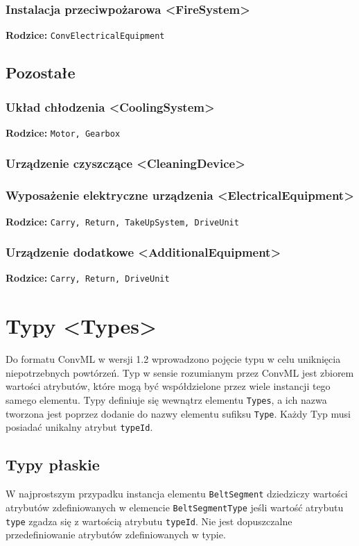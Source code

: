 \documentclass[12pt,a4paper]{article}
\begin{document}
\subsubsection{Instalacja przeciwpożarowa <FireSystem>}
\noindent\textbf{Rodzice:} \texttt{ConvElectricalEquipment}

\subsection{Pozostałe}

\subsubsection{Układ chłodzenia <CoolingSystem>}
\noindent\textbf{Rodzice:} \texttt{Motor, Gearbox}

\subsubsection{Urządzenie czyszczące <CleaningDevice>}


\subsubsection{Wyposażenie elektryczne urządzenia <ElectricalEquipment>}
\noindent\textbf{Rodzice:} \texttt{Carry, Return, TakeUpSystem, DriveUnit}


\subsubsection{Urządzenie dodatkowe <AdditionalEquipment>}
\noindent\textbf{Rodzice:} \texttt{Carry, Return, DriveUnit}


\section{Typy <Types>}\label{sec:Types}
Do formatu ConvML w wersji 1.2 wprowadzono pojęcie typu w celu uniknięcia
niepotrzebnych powtórzeń.  Typ w sensie rozumianym przez ConvML jest zbiorem
wartości atrybutów, które mogą być współdzielone przez wiele instancji tego
samego elementu.  Typy definiuje się wewnątrz elementu {\tt Types}, a ich nazwa
tworzona jest poprzez dodanie do nazwy elementu sufiksu {\tt Type}. Każdy Typ
musi posiadać unikalny atrybut {\tt typeId}.


\subsection{Typy płaskie}
W najprostszym przypadku instancja elementu {\tt BeltSegment} dziedziczy
wartości atrybutów zdefiniowanych w elemencie {\tt BeltSegmentType} jeśli
wartość atrybutu {\tt type} zgadza się z wartością atrybutu {\tt typeId}.  Nie
jest dopuszczalne przedefiniowanie atrybutów zdefiniowanych w typie.
\end{document}

